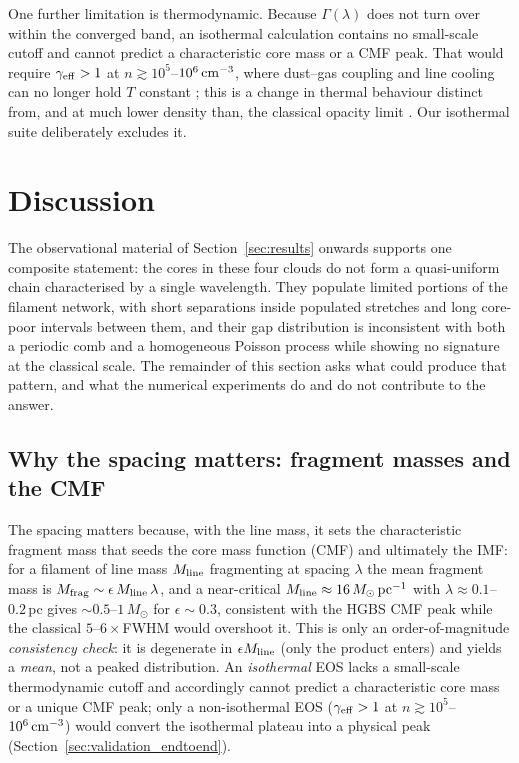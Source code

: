 \documentclass[usenatbib,twoside,twocolumn]{mnras}
\begin{document}
One further limitation is thermodynamic. Because $\Gamma(\lambda)$ does not turn over within the converged band, an isothermal calculation contains no small-scale cutoff and cannot predict a characteristic core mass or a CMF peak. That would require $\gamma_{\rm eff}>1$ at $n\gtrsim10^{5}$--$10^{6}\,{\rm cm^{-3}}$, where dust--gas coupling and line cooling can no longer hold $T$ constant \citep{Larson1985,Glover2012}; this is a change in thermal behaviour distinct from, and at much lower density than, the classical opacity limit \citep{Rees1976,LowLyndenBell1976}. Our isothermal suite deliberately excludes it.

\section{Discussion}

\noindent The observational material of Section~\ref{sec:results} onwards supports one composite statement: the cores in these four clouds do not form a quasi-uniform chain characterised by a single wavelength. They populate limited portions of the filament network, with short separations inside populated stretches and long core-poor intervals between them, and their gap distribution is inconsistent with both a periodic comb and a homogeneous Poisson process while showing no signature at the classical scale. The remainder of this section asks what could produce that pattern, and what the numerical experiments do and do not contribute to the answer.
\label{sec:discussion}

\subsection{Why the spacing matters: fragment masses and the CMF}
\label{sec:cmf}
The spacing matters because, with the line mass, it sets the characteristic fragment mass that seeds the core mass function (CMF) and ultimately the IMF: for a filament of line mass $M_{\rm line}$ fragmenting at spacing $\lambda$ the mean fragment mass is $M_{\rm frag}\sim\epsilon\,M_{\rm line}\,\lambda$, and a near-critical $M_{\rm line}\approx16\,M_\odot\,{\rm pc^{-1}}$ with $\lambda\approx0.1$--$0.2$\,pc gives $\sim0.5$--$1\,M_\odot$ for $\epsilon\sim0.3$, consistent with the HGBS CMF peak while the classical $5$--$6\times$FWHM would overshoot it. This is only an order-of-magnitude \emph{consistency check}: it is degenerate in $\epsilon M_{\rm line}$ (only the product enters) and yields a \emph{mean}, not a peaked distribution. An \emph{isothermal} EOS lacks a small-scale thermodynamic cutoff and accordingly cannot predict a characteristic core mass or a unique CMF peak; only a non-isothermal EOS ($\gamma_{\rm eff}>1$ at $n\gtrsim10^{5}$--$10^{6}\,{\rm cm^{-3}}$) would convert the isothermal plateau into a physical peak (Section~\ref{sec:validation_endtoend}).
\end{document}
